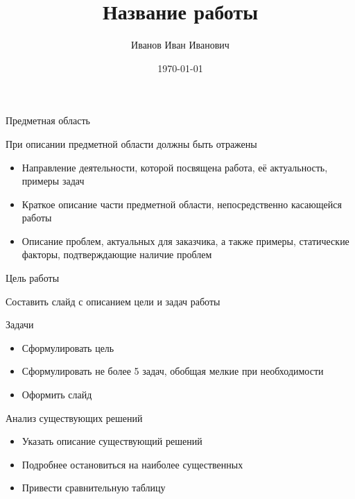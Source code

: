 \documentclass{../../cls/fefu_presentation}
\author{Иванов Иван Иванович}
\title{Название работы}
\date{\today}
\begin{document}
    
    \presentationtitlepage
    
    
    \begin{frame}{Предметная область}
        \begin{block}{}
            При описании предметной области должны быть отражены
            \begin{itemize}
                \item Направление деятельности, которой посвящена работа, её актуальность, примеры задач
                \item Краткое описание части предметной области, непосредственно касающейся работы
                \item Описание проблем, актуальных для заказчика, а также примеры, статические факторы, подтверждающие наличие проблем
            \end{itemize}
        \end{block}
    \end{frame}

    \note{}
    
    \begin{frame}{Цель работы}
        \begin{block}{}
            Составить слайд с описанием цели и задач работы
        \end{block}
        \begin{block}{Задачи}
            \begin{itemize}
                \item Сформулировать цель
                \item Сформулировать не более 5 задач, обобщая мелкие при необходимости
                \item Оформить слайд
            \end{itemize}
        \end{block}
    \end{frame}

    \note{}
    
    \begin{frame}{Анализ существующих решений}
        \begin{block}{}
            \begin{itemize}
                \item Указать описание существующий решений
                \item Подробнее остановиться на наиболее существенных
                \item Привести сравнительную таблицу
            \end{itemize}
        \end{block}
    \end{frame}
\end{document}
